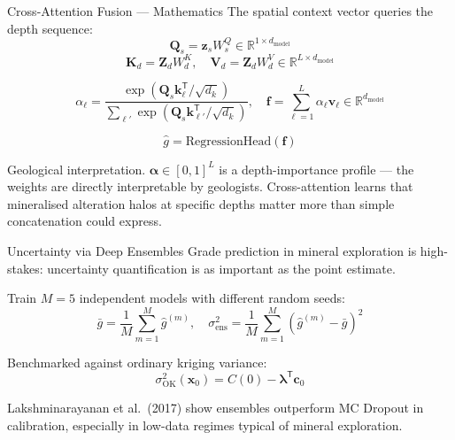\documentclass[aspectratio=169,11pt]{beamer}
\newcommand{\acc}[1]{{\color{Accent}#1}}
\newcommand{\mut}[1]{{\color{Muted}#1}}
\newcommand{\T}{\mathsf{T}}
\newcommand{\dmodel}{d_{\mathrm{model}}}
\newcommand{\dkey}{d_k}
\begin{document}
\begin{frame}{Cross-Attention Fusion — Mathematics}
  The spatial context vector queries the depth sequence:
  \[
    \mathbf{Q}_s = \mathbf{z}_s W^Q_s \in \mathbb{R}^{1 \times \dmodel}
  \]
  \[
    \mathbf{K}_d = \mathbf{Z}_d W^K_d, \quad \mathbf{V}_d = \mathbf{Z}_d W^V_d \in \mathbb{R}^{L \times \dmodel}
  \]

  \vspace{0.4em}
  \[
    \alpha_\ell = \frac{\exp(\mathbf{Q}_s \mathbf{k}_\ell^{\T} / \sqrt{\dkey})}{\sum_{\ell'} \exp(\mathbf{Q}_s \mathbf{k}_{\ell'}^{\T} / \sqrt{\dkey})}, \quad
    \mathbf{f} = \sum_{\ell=1}^{L} \alpha_\ell \mathbf{v}_\ell \in \mathbb{R}^{\dmodel}
  \]

  \vspace{0.6em}
  \[
    \hat{g} = \mathrm{RegressionHead}(\mathbf{f})
  \]

  \vspace{0.8em}
  \acc{Geological interpretation.} $\boldsymbol{\alpha} \in [0,1]^L$ is a depth-importance profile — the weights are directly interpretable by geologists. Cross-attention learns that mineralised alteration halos at specific depths matter more than simple concatenation could express.
\end{frame}

\begin{frame}{Uncertainty via Deep Ensembles}
  Grade prediction in mineral exploration is \acc{high-stakes}: uncertainty quantification is as important as the point estimate.

  \vspace{0.6em}
  Train $M = 5$ independent models with different random seeds:
  \[
    \bar{g} = \frac{1}{M} \sum_{m=1}^{M} \hat{g}^{(m)}, \quad
    \sigma^2_\text{ens} = \frac{1}{M} \sum_{m=1}^{M} \left(\hat{g}^{(m)} - \bar{g}\right)^2
  \]

  \vspace{0.6em}
  Benchmarked against ordinary kriging variance:
  \[
    \sigma^2_\text{OK}(\mathbf{x}_0) = C(0) - \boldsymbol{\lambda}^{\T} \mathbf{c}_0
  \]

  \vspace{0.6em}
  \mut{Lakshminarayanan et al.\ (2017) show ensembles outperform MC Dropout in calibration, especially in low-data regimes typical of mineral exploration.}
\end{frame}
\end{document}
